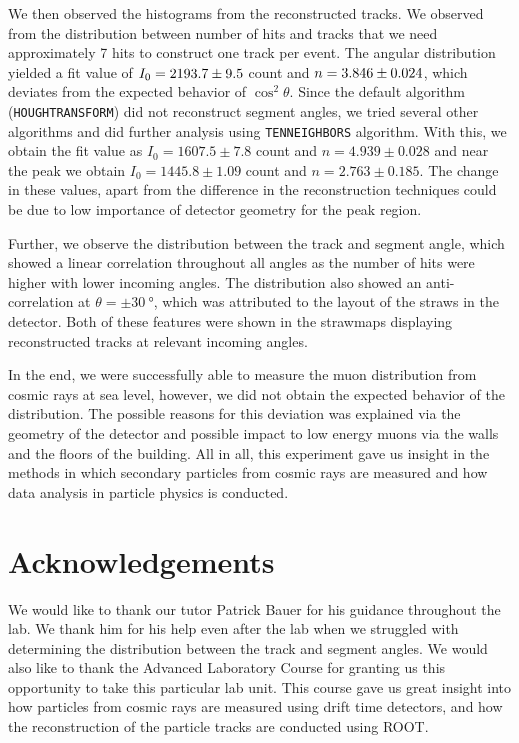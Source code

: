 \documentclass[a4paper]{report}
\numberwithin{equation}{section}
\begin{document}
We then observed the histograms from the reconstructed tracks. We observed from the distribution between number of hits and tracks 
that we need approximately 7 hits to construct one track per event. The angular distribution yielded a fit value of 
$I_0 = \num{2193.7 \pm 9.5}$ count and $n = \num{3.846 \pm 0.024}$, which deviates from the expected behavior of 
$\cos^2 \theta$. Since the default algorithm (\texttt{HOUGHTRANSFORM}) did not reconstruct segment angles, we tried several other algorithms and did further analysis using \texttt{TENNEIGHBORS} algorithm. With this, we obtain the fit value as $I_0 = 1607.5 \pm 7.8$ count and $n = 4.939 \pm 0.028$ and near the peak we obtain $I_0 = 1445.8 \pm 1.09$ count and $n = 2.763 \pm 0.185$. The change in these values, apart from the difference in the reconstruction techniques could be due to low importance of detector geometry for the peak region. 

Further, we observe the distribution between the track and segment angle, which showed a linear correlation throughout 
all angles as the number of hits were higher with lower incoming angles. The distribution also showed an anti-correlation 
at $\theta = \pm \SI{30}{\degree}$, which was attributed to the layout of the straws in the detector. Both of these features were 
shown in the strawmaps displaying reconstructed tracks at relevant incoming angles.\par 

In the end, we were successfully able to measure the muon distribution from cosmic rays at sea level, however, we did not obtain
the expected behavior of the distribution. The possible reasons for this deviation was explained via the geometry of the detector and possible impact to low energy muons via the walls and the floors of the building. All in all, this experiment gave us insight in the methods in which 
secondary particles from cosmic rays are measured and how data analysis in particle physics is conducted.


\chapter{Acknowledgements} \label{chap:ackn}

We would like to thank our tutor Patrick Bauer for his guidance throughout the lab. We thank him for his help even after the lab 
when we struggled with determining the distribution between the track and segment angles. We would also like to thank the Advanced 
Laboratory Course for granting us this opportunity to take this particular lab unit. This course gave us great insight into 
how particles from cosmic rays are measured using drift time detectors, and how the reconstruction of the particle tracks are 
conducted using ROOT. 
\end{document}
